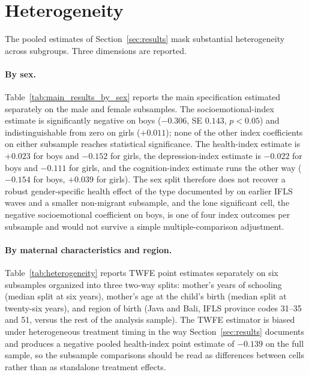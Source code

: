 
\section{Heterogeneity} \label{sec:heterogeneity}

The pooled estimates of Section~\ref{sec:results} mask substantial heterogeneity across subgroups. Three dimensions are reported.

\paragraph{By sex.} Table~\ref{tab:main_results_by_sex} reports the main specification estimated separately on the male and female subsamples. The socioemotional-index estimate is significantly negative on boys ($-0.306$, SE $0.143$, $p<0.05$) and indistinguishable from zero on girls ($+0.011$); none of the other index coefficients on either subsample reaches statistical significance. The health-index estimate is $+0.023$ for boys and $-0.152$ for girls, the depression-index estimate is $-0.022$ for boys and $-0.111$ for girls, and the cognition-index estimate runs the other way ($-0.154$ for boys, $+0.039$ for girls). The sex split therefore does not recover a robust gender-specific health effect of the type documented by \textcite{frankenberg2005} on earlier IFLS waves and a smaller non-migrant subsample, and the lone significant cell, the negative socioemotional coefficient on boys, is one of four index outcomes per subsample and would not survive a simple multiple-comparison adjustment.

\paragraph{By maternal characteristics and region.} Table~\ref{tab:heterogeneity} reports TWFE point estimates separately on six subsamples organized into three two-way splits: mother's years of schooling (median split at six years), mother's age at the child's birth (median split at twenty-six years), and region of birth (Java and Bali, IFLS province codes 31--35 and 51, versus the rest of the analysis sample). The TWFE estimator is biased under heterogeneous treatment timing in the way Section~\ref{sec:results} documents and produces a negative pooled health-index point estimate of $-0.139$ on the full sample, so the subsample comparisons should be read as differences between cells rather than as standalone treatment effects.

